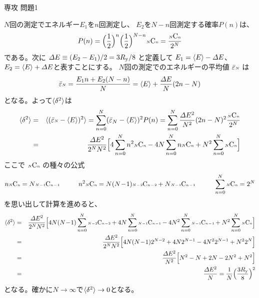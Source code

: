 \documentclass[fleqn]{jbook}
\begin{document}
\begin{answer}{専攻 問題1}{}
\begin{subanswers}
\begin{subsubanswers}
  \SubSubAnswer
    $N$回の測定でエネルギー$E_1$を$n$回測定し、
    $E_2$を$N-n$回測定する確率$P(n)$は、
%
    \[ P(n)%
       = \Bigl(\frac{1}{2}\Bigr)^{n}%
         \Bigl(\frac{1}{2}\Bigr)^{N-n}%
         \Comb{N}{n}%
       = \frac{\Comb{N}{n}}{2^N} \]
%
    である。次に ${\mit\Delta} E \equiv (E_2-E_1)/2 = 3R_{\rm y}/8$
    と定義して $E_1 = \langle{E}\rangle-{\mit\Delta} E$、
    $E_2 = \langle{E}\rangle+{\mit\Delta} E$と表すことにする。
    $N$回の測定でのエネルギーの平均値 $\bar{\varepsilon}\mbox{\tiny$N$}$ は
%
    \[ \bar{\eps}\mbox{\tiny$N$}%
       = \frac{E_1n+E_2(N-n)}{N}%
       = \Mean{E} + \frac{\IDelta E}{N}(2n-N) \]
%
    となる。よって$\langle{\delta^2}\rangle$は
%
    \begin{eqnarray*}
     \Mean{\delta^2}%
      &=& \Mean{(\bar{\eps}\mbox{\tiny$N$} - \Mean{E} )^2 }
       =  \sum_{n=0}^{N}(\bar{\eps}_N-\Mean{E})^2 P(n)
       =  \sum_{n=0}^{N}%
          \frac{\IDelta E^2}{N^2}(2n-N)^2%
          \frac{\Comb{N}{n}}{2^N} \\
      &=& \frac{\IDelta E^2}{2^NN^2} \Bigl[%
              4 \sum_{n=0}^{N} n^2 \Comb{N}{n}%
            -4N \sum_{n=0}^{N} n   \Comb{N}{n}%
            +N^2\sum_{n=0}^{N}     \Comb{N}{n} \Bigr]
    \end{eqnarray*}
%
    ここで $\mbox{\tiny$N$}{\rm C}\mbox{\tiny$n$}$ の種々の公式
%
    \[ n   \Comb{N}{n} = N \Comb{N\!-\!1}{n\!-\!1}%
       \hspace{10mm}%
       n^2 \Comb{N}{n} = N(N\!-\!1) \Comb{N\!-\!2}{n\!-\!2}%
                       + N \Comb{N\!-\!1}{n\!-\!1}%
       \hspace{10mm}%
       \sum_{n=0}^{N} \Comb{N}{n} = 2^N \]
%
    を思い出して計算を進めると、
%
    \begin{eqnarray*}
     \Mean{\delta^2}%
      &=& \frac{\IDelta E^2}{2^NN^2} \Bigl[%
            4N(N\!-\!1)\sum_{n=0}^{N} \Comb{N\!-\!2}{n\!-\!2}%
          + 4N     \sum_{n=0}^{N} \Comb{N\!-\!1}{n\!-\!1}%
          - 4N^2   \sum_{n=0}^{N} \Comb{N\!-\!1}{n\!-\!1}%
          +  N^2   \sum_{n=0}^{N} \Comb{N}{n}  \Bigr] \\
      &=& \frac{\IDelta E^2}{2^NN^2} \Bigl[%
            4N(N\!-\!1)2^{N-2}%
          + 4N     2^{N-1}%
          - 4N^2   2^{N-1}%
          +  N^2   2^{N}  \Bigr] \\
     &=& \frac{\IDelta E^2}{N^2} \Bigl[%
            N^2-N+2N-2N^2+N^2 
         \Bigr] \\
     &=& \frac{\IDelta E^2}{N}%
      =  \frac{1}{N}\Bigl(\frac{3R_{\rm y}}{8}\Bigr)^2
    \end{eqnarray*}
%
    となる。確かに$N\to\infty$で$\langle{\delta^2}\rangle\to 0$となる。
       
  \end{subsubanswers}
\end{subanswers}
\end{answer}
\end{document}
